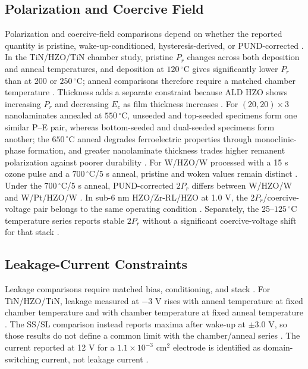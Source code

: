 \documentclass[11pt,a4paper]{report}
\begin{document}
\subsection{Polarization and Coercive Field}

Polarization and coercive-field comparisons depend on whether the reported quantity is pristine, wake-up-conditioned, hysteresis-derived, or PUND-corrected \cite{song2021ferro,kim2020tin,kashir2021wake}. In the TiN/HZO/TiN chamber study, pristine $P_r$ changes across both deposition and anneal temperatures, and deposition at $120\,^{\circ}\mathrm{C}$ gives significantly lower $P_r$ than at 200 or $250\,^{\circ}\mathrm{C}$; anneal comparisons therefore require a matched chamber temperature \cite{park2022chamber}. Thickness adds a separate constraint because ALD HZO shows increasing $P_r$ and decreasing $E_c$ as film thickness increases \cite{kim2014inductive}. For $(20,20)\times3$ nanolaminates annealed at $550\,^{\circ}\mathrm{C}$, unseeded and top-seeded specimens form one similar P--E pair, whereas bottom-seeded and dual-seeded specimens form another; the $650\,^{\circ}\mathrm{C}$ anneal degrades ferroelectric properties through monoclinic-phase formation, and greater nanolaminate thickness trades higher remanent polarization against poorer durability \cite{park2023seed}. For W/HZO/W processed with a 15 s ozone pulse and a $700\,^{\circ}\mathrm{C}$/5 s anneal, pristine and woken values remain distinct \cite{kashir2021wake}. Under the $700\,^{\circ}\mathrm{C}$/5 s anneal, PUND-corrected $2P_r$ differs between W/HZO/W and W/Pt/HZO/W \cite{kashir2021wake}. In sub-6 nm HZO/Zr-RL/HZO at 1.0 V, the $2P_r$/coercive-voltage pair belongs to the same operating condition \cite{liu2025zrrich}. Separately, the 25--$125\,^{\circ}\mathrm{C}$ temperature series reports stable $2P_r$ without a significant coercive-voltage shift for that stack \cite{liu2025zrrich}.
\subsection{Leakage-Current Constraints}

Leakage comparisons require matched bias, conditioning, and stack \cite{park2022chamber,kaatranen2026unif}. For TiN/HZO/TiN, leakage measured at $-3$ V rises with anneal temperature at fixed chamber temperature and with chamber temperature at fixed anneal temperature \cite{park2022chamber}. The SS/SL comparison instead reports maxima after wake-up at $\pm3.0$ V, so those results do not define a common limit with the chamber/anneal series \cite{kaatranen2026unif}. The current reported at 12 V for a $1.1\times10^{-3}$ cm$^2$ electrode is identified as domain-switching current, not leakage current \cite{kim2014inductive}.
\end{document}
